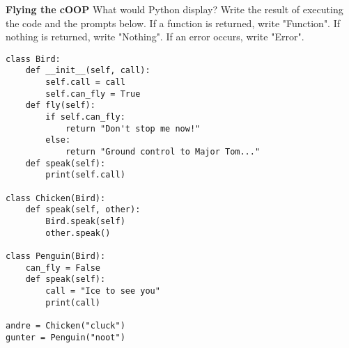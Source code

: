 \twocolumn
\begin{blocksection}

\question \textbf{Flying the cOOP} What would Python display? Write the result of executing the code and the prompts below. If a function is returned, write "Function". If nothing is returned, write "Nothing". If an error occurs, write "Error".

\vspace{2\baselineskip}

\begin{lstlisting}
class Bird:
    def __init__(self, call):
        self.call = call
        self.can_fly = True
    def fly(self):
        if self.can_fly:
            return "Don't stop me now!"
        else:
            return "Ground control to Major Tom..."
    def speak(self):
        print(self.call)

class Chicken(Bird):
    def speak(self, other):
        Bird.speak(self)
        other.speak()

class Penguin(Bird):
    can_fly = False
    def speak(self):
        call = "Ice to see you"
        print(call)

andre = Chicken("cluck")
gunter = Penguin("noot")
\end{lstlisting}
\end{blocksection}

